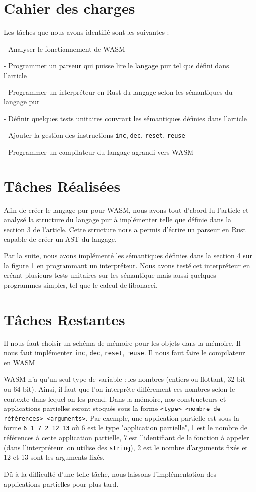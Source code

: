 \documentclass{rapportECL}
\begin{document}
\section{Cahier des charges}
Les tâches que nous avons identifié sont les suivantes :

- Analyser le fonctionnement de WASM

- Programmer un parseur qui puisse lire le langage pur tel que défini dans l'article\cite{ullrich_counting_2020}

- Programmer un interpréteur en Rust du langage selon les sémantiques du langage pur

- Définir quelques tests unitaires couvrant les sémantiques définies dans l'article

- Ajouter la gestion des instructions \verb|inc|, \verb|dec|, \verb|reset|, \verb|reuse|

- Programmer un compilateur du langage agrandi vers WASM

\section{Tâches Réalisées}

Afin de créer le langage pur pour WASM, nous avons tout d'abord lu l'article\cite{ullrich_counting_2020} 
et analysé la structure du langage pur à implémenter telle que définie dans la section 3 de l'article.
Cette structure nous a permis d'écrire un parseur en Rust capable de créer un AST du langage.

Par la suite, nous avons implémenté les sémantiques définies dans la section 4 sur la figure 1 en programmant un interpréteur. 
Nous avons testé cet interpréteur en créant plusieurs tests unitaires sur les sémantique mais aussi quelques programmes simples, 
tel que le calcul de fibonacci.

\section{Tâches Restantes}

Il nous faut choisir un schéma de mémoire pour les objets dans la mémoire.
Il nous faut implémenter \verb|inc|, \verb|dec|, \verb|reset|, \verb|reuse|.
Il nous faut faire le compilateur en WASM

WASM n'a qu'un seul type de variable : les nombres (entiers ou flottant, 32 bit ou 64 bit). 
Ainsi, il faut que l'on interprète différement ces nombres selon le contexte dans lequel on les prend. 
Dans la mémoire, nos constructeurs et applications partielles seront stoqués sous la forme \verb|<type> <nombre de références> <arguments>|. 
Par exemple, une application partielle est sous la forme \verb|6 1 7 2 12 13| où 6 est le type "application partielle", 
1 est le nombre de références à cette application partielle, 
7 est l'identifiant de la fonction à appeler (dans l'interpréteur, on utilise des \verb|string|), 
2 est le nombre d'arguments fixés et 12 et 13 sont les arguments fixés.

Dû à la difficulté d'une telle tâche, nous laissons l'implémentation des applications partielles pour plus tard.

\printbibliography
\end{document}
